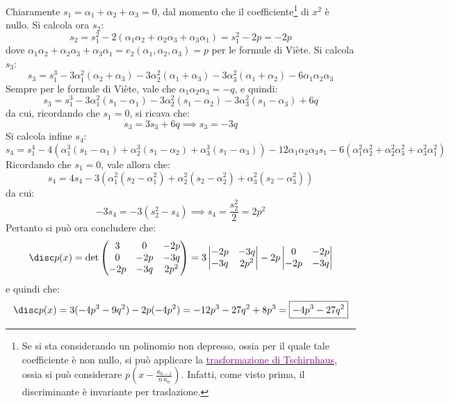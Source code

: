 \documentclass[11pt]{scrartcl}
\begin{document}
\begin{remark}
		
		Chiaramente $s_1 = \alpha_1 + \alpha_2 + \alpha_3 = 0$, dal momento che il coefficiente\footnote{
			Se si sta considerando un polinomio non depresso, ossia per il quale tale
			coefficiente è non nullo, si può applicare la \href{https://en.wikipedia.org/wiki/Tschirnhaus_transformation}{\textcolor{purple}{trasformazione di Tschirnhaus}},
			ossia si può considerare $p\left(x - \frac{a_{n-1}}{n \, a_n}\right)$. Infatti, come visto prima, il discriminante è invariante
			per traslazione.
		} di $x^2$ è nullo. Si calcola ora $s_2$:
		\[ s_2 = s_1^2 - 2(\alpha_1 \alpha_2 + \alpha_2 \alpha_3 + \alpha_3 \alpha_1) = s_1^2 - 2 p = -2p \]
		dove $\alpha_1 \alpha_2 + \alpha_2 \alpha_3 + \alpha_3 \alpha_1 = e_2(\alpha_1, \alpha_2, \alpha_3) = p$ per le formule di Viète.
		Si calcola $s_3$:
		\[ s_3 = s_1^3 - 3 \alpha_1^2 (\alpha_2 + \alpha_3) - 3 \alpha_2^2 (\alpha_1 + \alpha_3) - 3 \alpha_3^2 (\alpha_1 + \alpha_2) - 6 \alpha_1 \alpha_2 \alpha_3 \]
		Sempre per le formule di Viète, vale che $\alpha_1 \alpha_2 \alpha_3 = -q$, e quindi:
		\[ s_3 = s_1^3 - 3 \alpha_1^2 (s_1 - \alpha_1) - 3 \alpha_2^2 (s_1 - \alpha_2) - 3 \alpha_3^2 (s_1 - \alpha_3) + 6 q \]
		da cui, ricordando che $s_1 = 0$, si ricava che:
		\[ s_3 = 3s_3 + 6q \implies s_3 = -3q \]
		Si calcola infine $s_4$:
		\[  s_4 = s_1^4 - 4(\alpha_1^3(s_1 - \alpha_1) + \alpha_2^3(s_1 - \alpha_2) + \alpha_3^3(s_1 - \alpha_3)) - 12 \alpha_1\alpha_2\alpha_3 s_1 - 6 (\alpha_1^2\alpha_2^2 + \alpha_2^2 \alpha_3^2 + \alpha_3^2 \alpha_1^2) \]
		Ricordando che $s_1 = 0$, vale allora che:
		\[ s_4 = 4s_4 - 3 (\alpha_1^2 (s_2 - \alpha_1^2) + \alpha_2^2 (s_2 - \alpha_2^2) + \alpha_3^2 (s_2 - \alpha_3^2)) \]
		da cui:
		\[ -3 s_4 = - 3(s_2^2 - s_4) \implies s_4 = \frac{s_2^2}{2} = 2p^2 \]
		Pertanto si può ora concludere che:
		\[ \disc p(x) = \det \begin{pmatrix}
			3 & 0 & -2p \\ 0 & -2p & -3q \\ -2p & -3q & 2p^2
		\end{pmatrix} = 3 \begin{vmatrix}
			-2p & -3q \\ -3q & 2p^2
		\end{vmatrix} -2p \begin{vmatrix}
			0 & -2p \\ -2p & -3q
		\end{vmatrix} \]
		e quindi che:
		\[ \disc p(x) = 3(-4p^3 - 9q^2) -2p(-4p^2) = -12 p^3 - 27 q^2 + 8p^3 = \boxed{-4p^3 - 27q^2} \]
	\end{remark}
	
\end{document}
